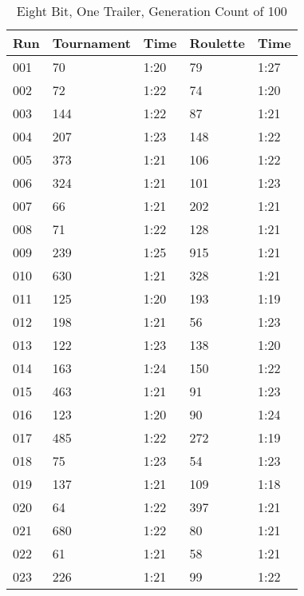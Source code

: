 \begin{center}
	\begin{longtable}{|p{2cm}|l|l|l|l|}
	\caption{Eight Bit, One Trailer, Generation Count of 100}
		\hline
Run & Tournament      & Time   &     Roulette         & Time \\ \hline
001	&   70            &  1:20  &		79      	& 1:27 \\ \hline
002	&   72            &  1:22  &		74      	& 1:20 \\ \hline
003	&   144           &  1:22  &		87      	& 1:21 \\ \hline
004	&   207           &  1:23  &		148     	& 1:22 \\ \hline
005	&   373           &  1:21  &		106     	& 1:22 \\ \hline
006	&   324           &  1:21  &		101     	& 1:23 \\ \hline
007	&   66            &  1:21  &		202     	& 1:21 \\ \hline
008	&   71            &  1:22  &		128     	& 1:21 \\ \hline
009	&   239           &  1:25  &		915     	& 1:21 \\ \hline
010	&   630           &  1:21  &		328     	& 1:21 \\ \hline
011	&   125           &  1:20  &		193     	& 1:19 \\ \hline
012	&   198           &  1:21  &		56      	& 1:23 \\ \hline
013	&   122           &  1:23  &		138     	& 1:20 \\ \hline
014	&   163           &  1:24  &		150     	& 1:22 \\ \hline
015	&   463           &  1:21  &		91      	& 1:23 \\ \hline
016	&   123           &  1:20  &		90      	& 1:24 \\ \hline
017	&   485           &  1:22  &		272     	& 1:19 \\ \hline
018	&   75            &  1:23  &		54      	& 1:23 \\ \hline
019	&   137           &  1:21  &		109     	& 1:18 \\ \hline
020	&   64            &  1:22  &		397     	& 1:21 \\ \hline
021	&   680           &  1:22  &		80          & 1:21 \\ \hline
022	&   61            &  1:21  &		58      	& 1:21 \\ \hline
023	&   226           &  1:21  &		99      	& 1:22 \\ \hline

\end{longtable}
\end{center}
